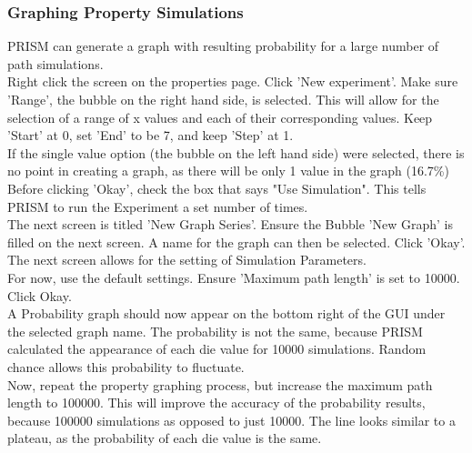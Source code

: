\documentclass[a4paper]{article}
\begin{document}
\subsubsection{Graphing Property Simulations }
PRISM can generate a graph with resulting probability for a large number of path simulations.
\\[1\baselineskip]
Right click the screen on the properties page. Click 'New experiment'. Make sure 'Range', the bubble on the right hand side, is selected. This will allow for the selection of a range of x values and each of their corresponding values. Keep 'Start' at 0, set 'End' to be 7, and keep 'Step' at 1.
\\[1\baselineskip]
If the single value option (the bubble on the left hand side) were selected, there is no point in creating a graph, as there will be only 1 value in the graph (16.7\%)
\\[1\baselineskip]
Before clicking 'Okay', check the box that says "Use Simulation". This tells PRISM to run the Experiment a set number of times. 
\\[1\baselineskip]
The next screen is titled 'New Graph Series'.
Ensure the Bubble 'New Graph' is filled on the next screen. A name for the graph can then be selected. Click 'Okay'.
\\[1\baselineskip]
The next screen allows for the setting of Simulation Parameters.
\\[1\baselineskip]
For now, use the default settings. Ensure 'Maximum path length' is set to 10000. Click Okay.
\\[1\baselineskip]
A Probability graph should now appear on the bottom right of the GUI under the selected graph name. The probability is not the same, because PRISM calculated the appearance of each die value for 10000 simulations. Random chance allows this probability to fluctuate. 
\\[1\baselineskip]
Now, repeat the property graphing process, but increase the maximum path length to 100000. This will improve the accuracy of the probability results, because 100000 simulations as opposed to just 10000. The line looks similar to a plateau, as the probability of each die value is the same.
\end{document}
